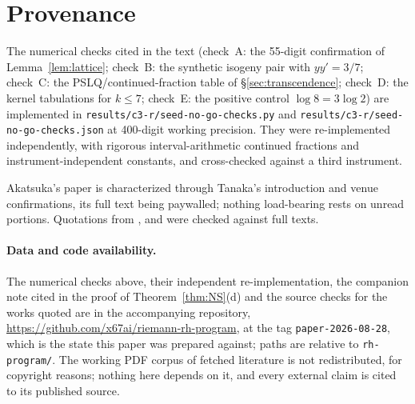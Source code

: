 \documentclass[11pt]{article}
\theoremstyle{definition}
\theoremstyle{remark}
\begin{document}
\section*{Provenance}

The numerical checks cited in the text (check~A: the 55-digit confirmation
of Lemma~\ref{lem:lattice}; check~B: the synthetic isogeny pair with
$y y' = 3/7$; check~C: the PSLQ/continued-fraction table of
\S\ref{sec:transcendence}; check~D: the kernel tabulations for $k \leq 7$;
check~E: the positive control $\log 8 = 3\log 2$) are implemented in
\texttt{results/c3-r/}\allowbreak\texttt{seed-no-go-checks.py} and
\texttt{results/c3-r/}\allowbreak\texttt{seed-no-go-checks.json} at
400-digit working precision. They were re-implemented independently, with
rigorous interval-arithmetic continued fractions and instrument-independent
constants, and cross-checked against a third instrument.

Akatsuka's paper \cite{Ak09} is characterized through Tanaka's introduction
\cite{Ta20} and venue confirmations, its full text being paywalled; nothing
load-bearing rests on unread portions. Quotations from \cite{CC26},
\cite{CC25} and \cite{CE15} were checked against full texts.

\paragraph{Data and code availability.} The numerical checks above, their
independent re-implementation, the companion note cited in the proof of
Theorem~\ref{thm:NS}(d) and the source checks for the works quoted are in
the accompanying repository, \url{https://github.com/x67ai/riemann-rh-program},
at the tag \texttt{paper-2026-08-28}, which is the state this paper was
prepared against; paths are relative to \texttt{rh-program/}. The working PDF
corpus of fetched literature is not redistributed, for copyright reasons;
nothing here depends on it, and every external claim is cited to its published
source.
\end{document}
